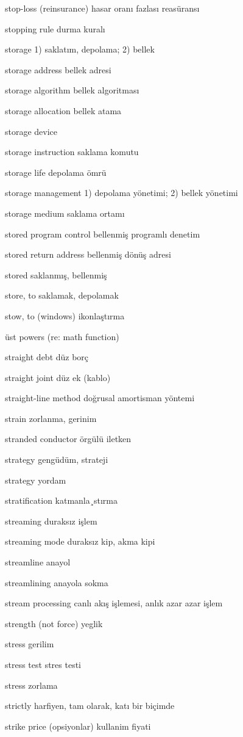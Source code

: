 \documentclass[12pt,fleqn]{article}\usepackage{../../common}
\begin{document}
stop-loss (reinsurance) hasar oranı fazlası reasüransı

stopping rule durma kuralı

storage 1) saklatım, depolama; 2) bellek

storage address bellek adresi

storage algorithm bellek algoritması

storage allocation bellek atama

storage device

storage instruction saklama komutu

storage life depolama ömrü

storage management 1) depolama yönetimi; 2) bellek yönetimi

storage medium saklama ortamı

stored program control bellenmiş programlı denetim

stored return address bellenmiş dönüş adresi

stored saklanmış, bellenmiş

store, to saklamak, depolamak

stow, to (windows) ikonlaştırma

üst powers (re: math function)

straight debt düz borç

straight joint düz ek (kablo)

straight-line method doğrusal amortisman yöntemi

strain zorlanma, gerinim

stranded conductor örgülü iletken

strategy gengüdüm, strateji

strategy yordam

stratification katmanla¸stırma

streaming duraksız işlem

streaming mode duraksız kip, akma kipi

streamline anayol

streamlining anayola sokma

stream processing canlı akış işlemesi, anlık azar azar işlem

strength (not force) yeglik

stress gerilim

stress test stres testi

stress zorlama

strictly harfiyen, tam olarak, katı bir biçimde

strike price (opsiyonlar) kullanim fiyati
\end{document}
